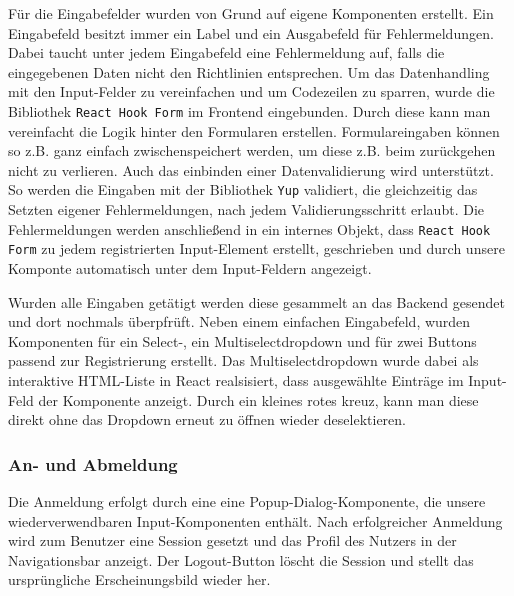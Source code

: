 \documentclass[conference,a4paper,flushend]{cs-techrep}
\begin{document}
Für die Eingabefelder wurden von Grund auf eigene Komponenten erstellt. Ein Eingabefeld besitzt immer ein Label und ein Ausgabefeld für Fehlermeldungen. Dabei taucht unter jedem Eingabefeld eine Fehlermeldung auf, falls die eingegebenen Daten nicht den Richtlinien entsprechen. 
Um das Datenhandling mit den Input-Felder zu vereinfachen und um Codezeilen zu sparren, wurde die Bibliothek \texttt{React Hook Form} im Frontend eingebunden. Durch diese kann man vereinfacht die Logik hinter den Formularen erstellen. 
Formulareingaben können so z.B. ganz einfach zwischenspeichert werden, um diese z.B. beim zurückgehen nicht zu verlieren. Auch das einbinden einer Datenvalidierung wird unterstützt. So werden die Eingaben mit der Bibliothek \texttt{Yup} validiert, die gleichzeitig das Setzten eigener Fehlermeldungen, nach jedem Validierungsschritt erlaubt. Die Fehlermeldungen werden anschließend in ein internes Objekt, dass \texttt{React Hook Form} zu jedem registrierten Input-Element erstellt, geschrieben und durch unsere Komponte automatisch unter dem Input-Feldern angezeigt. 

Wurden alle Eingaben getätigt werden diese gesammelt an das Backend gesendet und dort nochmals überpfrüft.
Neben einem einfachen Eingabefeld, wurden Komponenten für ein Select-, ein Multiselectdropdown und für zwei Buttons passend zur Registrierung erstellt. Das Multiselectdropdown wurde dabei als interaktive HTML-Liste in React realsisiert, dass ausgewählte Einträge im Input-Feld der Komponente anzeigt. Durch ein kleines rotes kreuz, kann man diese direkt ohne das Dropdown erneut zu öffnen wieder deselektieren.


\subsubsection{An- und Abmeldung\\}
Die Anmeldung erfolgt durch eine eine Popup-Dialog-Komponente, die unsere wiederverwendbaren Input-Komponenten enthält. Nach erfolgreicher Anmeldung wird zum Benutzer eine Session gesetzt und das Profil des Nutzers in der Navigationsbar anzeigt. Der Logout-Button löscht die Session und stellt das ursprüngliche Erscheinungsbild wieder her.
\end{document}
